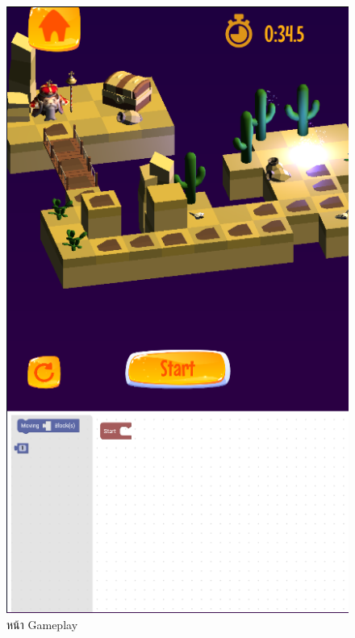 \begin{figure}
\begin{center}
\includegraphics[scale = 0.4]{pic/gameplay.PNG}
\end{center}
\caption[Poem]{หน้า Gameplay}
\label{game}
\end{figure}

